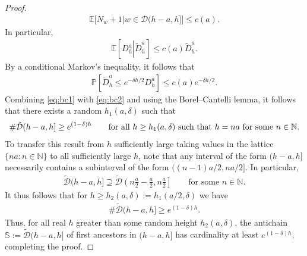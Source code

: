 \documentclass[10pt,a4paper]{amsart}
\begin{document}
\begin{proof}
		\begin{align*}
			\mathbb{E}\big[N_w+1 | w \in \mathcal{D}(h-a,h]\big] \leq c(a).
		\end{align*}
		In particular, 
		\begin{align*}
			\mathbb{E}\left[ D_h^a \left| \tilde{D}_h^a\right. \right] \leq c(a) \tilde{D}_h^a.
		\end{align*}
		By a conditional Markov's inequality, it follows that
		\begin{align} \label{eq:bc2}
			\mathbb{P}\left[ \tilde{D}_h^a \leq e^{ -\delta h/2} D_h^a \right] \leq c(a) e^{ - \delta h/2}.
		\end{align}
		Combining \eqref{eq:bc1} with \eqref{eq:bc2} and using the Borel--Cantelli lemma, 
		it follows that there exists a random $h_1(a,\delta)$ such that 
		\begin{align*}
			\# \tilde{\mathcal{D}}(h-a,h] \geq e^{(1-\delta)h} \qquad 
			\text{for all $h \geq h_1(a,\delta)$ such that $ h  = na $ for some $n \in \mathbb{N}$}.  
		\end{align*} 
		To transfer this result from $h$ sufficiently large taking values in the lattice 
		$\{ n a : n \in \mathbb{N} \}$ to all sufficiently large $h$, 
		note that any interval of the form $(h-a,h]$ necessarily contains a subinterval of the form $((n-1)a/2,na/2]$. In particular,
		\begin{align*}
			\tilde{\mathcal{D}}(h-a,h] \supseteq \tilde{\mathcal{D}}\left(n\frac{a}{2} - \frac{a}{2}, n\frac{a}{2} \right] 
			\qquad \text{for some $n \in \mathbb{N}$}.
		\end{align*}
		It thus follows that for $h \geq h_2(a,\delta) := h_1(a/2,\delta)$ we have
		\begin{align*}
			\# \tilde{\mathcal{D}}(h-a,h] \geq e^{(1-\delta)h}.
		\end{align*}
		Thus, for all real $h$ greater than some random height $h_2(a,\delta)$, 
		the antichain $\mathbb{S} := \tilde{\mathcal{D}}(h-a,h]$ of first ancestors in $(h-a,h]$ 
		has cardinality at least $e^{(1-\delta)h}$, completing the proof.
\end{proof}
\end{document}
